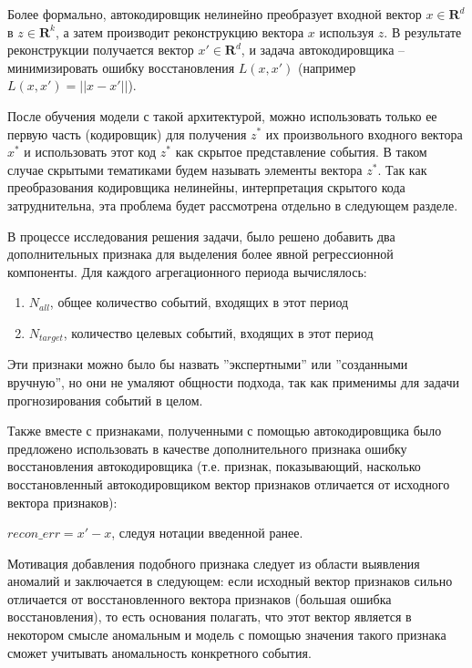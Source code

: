 Более формально, автокодировщик нелинейно преобразует входной вектор $x \in \mathbf{R}^d$ в $z \in \mathbf{R}^k$, а затем производит реконструкцию вектора $x$ используя $z$. В результате реконструкции получается вектор $x' \in \mathbf{R}^d$, и задача автокодировщика -- минимизировать ошибку восстановления $L(x,x')$ (например $L(x,x')=||x - x'||$).

После обучения модели с такой архитектурой, можно использовать только ее первую часть (кодировщик) для получения $z^*$ их произвольного входного вектора $x^*$ и использовать этот код $z^*$ как скрытое представление события. В таком случае скрытыми тематиками будем называть элементы вектора $z^*$.
Так как преобразования кодировщика нелинейны, интерпретация скрытого кода затруднительна, эта проблема будет рассмотрена отдельно в следующем разделе.

В процессе исследования решения задачи, было решено добавить два дополнительных признака для выделения более явной регрессионной компоненты. Для каждого агрегационного периода вычислялось:
\begin{enumerate}
   \item $N_{all}$, общее количество событий, входящих в этот период
   \item $N_{target}$, количество целевых событий, входящих в этот период
\end{enumerate}

Эти признаки можно было бы назвать ''экспертными'' или ''созданными вручную'', но они не умаляют общности подхода, так как применимы для задачи прогнозирования событий в целом.

Также вместе с признаками, полученными с помощью автокодировщика было предложено использовать в качестве дополнительного признака ошибку восстановления автокодировщика (т.е. признак, показывающий, насколько восстановленный автокодировщиком вектор признаков отличается от исходного вектора признаков):

$recon\_err = x' - x$, следуя нотации введенной ранее.

Мотивация добавления подобного признака следует из области выявления аномалий \cite{anomaly_detection_ae} и заключается в следующем: если исходный вектор признаков сильно отличается от восстановленного вектора признаков (большая ошибка восстановления), то есть основания полагать, что этот вектор является в некотором смысле аномальным и модель с помощью значения такого признака сможет учитывать аномальность конкретного события.

